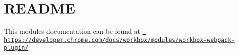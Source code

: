 \chapter{README}
\hypertarget{md_node__modules_2workbox-webpack-plugin_2README}{}\label{md_node__modules_2workbox-webpack-plugin_2README}
This module\textquotesingle{}s documentation can be found at \href{https://developer.chrome.com/docs/workbox/modules/workbox-webpack-plugin/}{\texttt{ https\+://developer.\+chrome.\+com/docs/workbox/modules/workbox-\/webpack-\/plugin/}} 